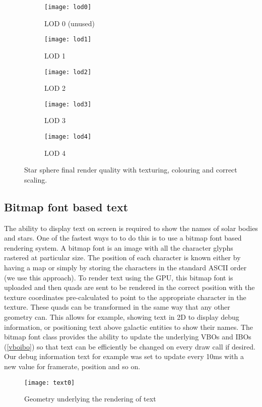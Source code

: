 \begin{figure}[!htbp]
\centering
\begin{subfigure}{.33\textwidth}
  \centering
  \texttt{[image: lod0]}
  \caption{LOD 0 (unused)}
  \label{fig:lod0}
\end{subfigure}%
\begin{subfigure}{.33\textwidth}
  \centering
  \texttt{[image: lod1]}
  \caption{LOD 1}
  \label{fig:lod1}
\end{subfigure}%
\begin{subfigure}{.33\textwidth}
  \centering
  \texttt{[image: lod2]}
  \caption{LOD 2}
  \label{fig:lod2}
\end{subfigure}
\begin{subfigure}{.33\textwidth}
  \centering
  \texttt{[image: lod3]}
  \caption{LOD 3}
  \label{fig:lod3}
\end{subfigure}
\begin{subfigure}{.33\textwidth}
  \centering
  \texttt{[image: lod4]}
  \caption{LOD 4}
  \label{fig:lod4}
\end{subfigure}
\caption{Star sphere final render quality with texturing, colouring and correct scaling.}
\label{fig:lods}
\end{figure}

\subsection{Bitmap font based text}
\label{bitmapfont}

The ability to display text on screen is required to show the names of solar bodies and stars. One of the fastest ways to to do this is to use a bitmap font based rendering system. 
A bitmap font is an image with all the character glyphs rastered at particular size. 
The position of each character is known either by having a map or simply by storing the characters in the standard ASCII order (we use this approach). 
To render text using the GPU, this bitmap font is uploaded and then quads are sent to be rendered in the correct position with the texture coordinates pre-calculated to point to the appropriate character in the texture. 
These quads can be transformed in the same way that any other geometry can. This allows for example, showing text in 2D to display debug information, or positioning text above galactic entities to show their names.
The bitmap font class provides the ability to update the underlying VBOs and IBOs (\cref{vboibo}) so that text can be efficiently be changed on every draw call if desired. Our debug information text for example was set to update every 10ms with a new value for framerate, position and so on.
\\
\begin{figure}[!htbp]
  \begin{center}
    \leavevmode
    \ifpdf
      \texttt{[image: text0]}
    \fi
    \caption{Geometry underlying the rendering of text}
    \label{FigText0}
  \end{center}
\end{figure}

